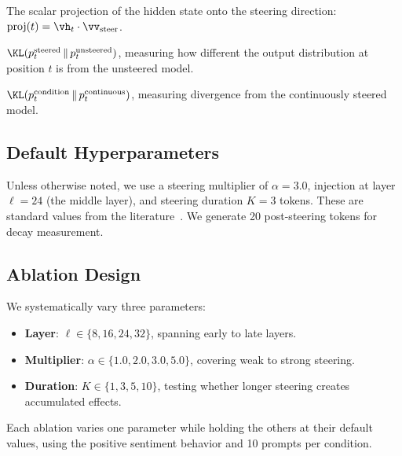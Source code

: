 The scalar projection of the hidden state onto the steering direction:
$\text{proj}(t) = \vh_t \cdot \steeringvec$.

$\KL(p_t^{\text{steered}} \,\|\, p_t^{\text{unsteered}})$, measuring how
different the output distribution at position $t$ is from the unsteered model.

$\KL(p_t^{\text{condition}} \,\|\, p_t^{\text{continuous}})$, measuring
divergence from the continuously steered model.

\subsection{Default Hyperparameters}
\label{sec:hyperparams}

Unless otherwise noted, we use a steering multiplier of $\alpha = 3.0$,
injection at layer $\ell = 24$ (the middle layer), and steering duration
$K = 3$ tokens. These are standard values from the \caa
literature~\citep{panickssery2024caa}. We generate 20 post-steering tokens
for decay measurement.

\subsection{Ablation Design}
\label{sec:ablation_design}

We systematically vary three parameters:

\begin{itemize}[leftmargin=*,itemsep=1pt,topsep=2pt]
\item \textbf{Layer}: $\ell \in \{8, 16, 24, 32\}$, spanning early to late
      layers.
\item \textbf{Multiplier}: $\alpha \in \{1.0, 2.0, 3.0, 5.0\}$, covering
      weak to strong steering.
\item \textbf{Duration}: $K \in \{1, 3, 5, 10\}$, testing whether longer
      steering creates accumulated effects.
\end{itemize}

Each ablation varies one parameter while holding the others at their default
values, using the positive sentiment behavior and 10 prompts per condition.
